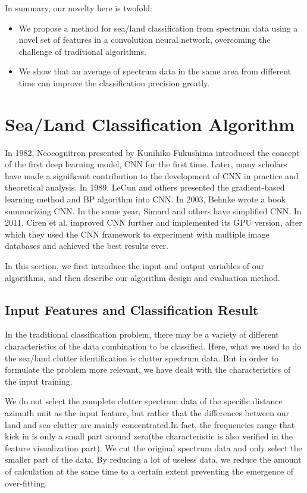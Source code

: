 In summary, our novelty here is twofold:
\begin{itemize}
	\item We propose a method for sea/land classification from spectrum data using a novel set of features in a convolution neural network, overcoming the challenge of traditional algorithms.
	\item We show that an average of spectrum data in  the same area from different time can improve the classification precision greatly.
\end{itemize}

\section{Sea/Land Classification Algorithm}

In 1982, Neocognitron presented by Kunihiko Fukushima\cite{fukushima1982neocognitron} introduced the concept of the first deep learning model, CNN for the first time. Later, many scholars have made a significant contribution to the development of CNN in practice and theoretical analysis. In 1989, LeCun and others presented the gradient-based learning method\cite{lecun1998gradient} and BP algorithm\cite{lecun1989backpropagation} into CNN. In 2003, Behnke wrote a book summarizing CNN\cite{behnke2003hierarchical}. In the same year, Simard and others have simplified CNN\cite{simard2003best}. In 2011, Ciren et al. improved CNN further and implemented its GPU version\cite{ciresan2011flexible}, after which they used the CNN framework to experiment with multiple image databases and achieved the best results ever.

In this section, we first introduce the input and output variables of our algorithms, and then describe our algorithm design and evaluation method.
\subsection{Input Features and Classification Result}
In the traditional classification problem, there may be a variety of different characteristics of the data combination to be classified. Here, what we used to do the sea/land clutter identification is clutter spectrum data. But in order to formulate the problem more relevant, we have dealt with the characteristics of the input training.

We do not select the complete clutter spectrum data of the specific distance azimuth unit as the input feature, but rather that the differences between our land and sea clutter are mainly concentrated.In fact, the frequencies range that kick in is only a small part around zero(the characteristic is also verified in the feature visualization part). We cut the original spectrum data and only select the smaller part of the data. By reducing a lot of useless data, we reduce the amount of calculation at the same time to a certain extent preventing the emergence of over-fitting.

